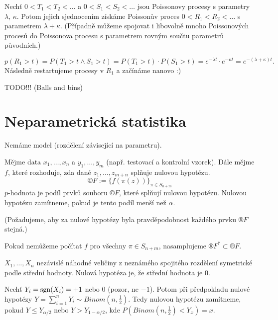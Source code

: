 \documentclass[12pt]{article}					%
\begin{document}
\begin{veta}
	Nechť $0 < T_1 < T_2 < …$ a $0 < S_1 < S_2 < …$ jsou Poissonovy procesy s parametry $\lambda$, $\kappa$. Potom jejich sjednocením získáme Poissonův proces $0 < R_1 < R_2 < …$ s parametrem $\lambda + \kappa$. (Případně můžeme spojovat i libovolně mnoho Poissonových procesů do Poissonova procesu s parametrem rovným součtu parametrů původních.)

	\begin{dukazin}
		$$ p(R_1 > t) = P(T_1 > t \land S_1 > t) = P(T_1 > t)·P(S_1 > t) = e^{-\lambda t}·e^{-\kappa t} = e^{-(\lambda + \kappa) t}. $$
		Následně restartujeme procesy v $R_1$ a začínáme nanovo :)
	\end{dukazin}
\end{veta}

TODO!!! (Balls and bins) %

\section{Neparametrická statistika}
\begin{definice}
	Nemáme model (rozdělení závisející na parametru).
\end{definice}

\begin{definice}
	Mějme data $x_1, …, x_n$ a $y_1, …, y_m$ (např. testovací a kontrolní vzorek). Dále mějme $f$, které rozhoduje, zda dané $z_1, …, z_{m+n}$ splňuje nulovou hypotézu.
	$$ ©F := \{f(\pi(z))\}_{\pi \in S_{n + m}} $$
	$p$-hodnota je podíl prvků souboru $©F$, které splňují nulovou hypotézu. Nulovou hypotézu zamítneme, pokud je tento podíl menší než $\alpha$.

	(Požadujeme, aby za nulové hypotézy byla pravděpodobnost každého prvku $®F$ stejná.)
\end{definice}

\begin{definice}
	Pokud nemůžeme počítat $f$ pro všechny $\pi \in S_{n+m}$, nasamplujeme $®F^* \subset ®F$.
\end{definice}

\begin{definice}
	$X_1, …, X_n$ nezávislé náhodné veličiny z neznámého spojitého rozdělení symetrické podle střední hodnoty. Nulová hypotéza je, že střední hodnota je 0.

	Nechť $Y_i = \operatorname{sgn}(X_i) = +1$ nebo $0$ (pozor, ne $-1$). Potom při předpokladu nulové hypotézy $Y = \sum_{i=1}^n Y_i \sim Binom(n, \frac{1}{2})$. Tedy nulovou hypotézu zamítneme, pokud $Y ≤ Y_{\alpha / 2}$ nebo $Y > Y_{1 - \alpha / 2}$, kde $P(Binom(n, \frac{1}{2}) < Y_x) = x$.
\end{definice}
\end{document}
